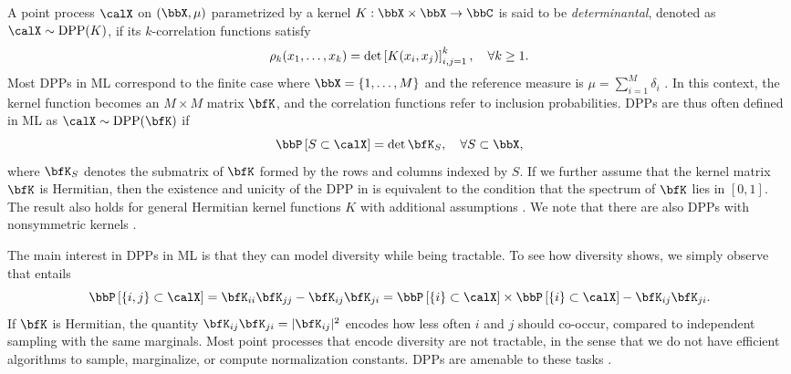 A point process $\calX$ on $(\bbX,\mu)$ parametrized by a kernel $K:\bbX\times \bbX\rightarrow \bbC$ is said to be \emph{determinantal}, denoted as $\calX\sim\DPP(K)$, if its $k$-correlation functions satisfy
  \begin{equation*}
  \label{eq:k-correlation_function_DPP}
    \rho_k(x_1,\dots,x_k)
      = \det \left[ K(x_i, x_j) \right]_{i,j=1}^k,
    \quad \forall k\geq 1.
  \end{equation*}
	Most DPPs in ML correspond to the finite case where $\bbX = \lrcb{1,\dots,M}$ and the reference measure is $\mu=\sum_{i=1}^M \delta_i$ \citep{KuTa12}.
	In this context, the kernel function becomes an $M\times M$ matrix $\bfK$, and the correlation functions refer to inclusion probabilities.
DPPs are thus often defined in ML as $\calX\sim \DPP(\bfK)$ if
  \begin{equation}
  \label{eq:inclusion_proba_finite}
    \Proba{S \subset \calX} = \det {\bfK}_S,
      \quad\forall S\subset \bbX,
  \end{equation}
where ${\bfK}_S$ denotes the submatrix of $\bfK$ formed by the rows and columns indexed by $S$.
If we further assume that the kernel matrix $\bfK$ is Hermitian, then the existence and unicity of the DPP in  is equivalent to the condition that the spectrum of $\bfK$ lies in $[0,1]$.
The result also holds for general Hermitian kernel functions $K$ with additional assumptions \cite[Theorem 3]{Sos00}.
We note that there are also DPPs with nonsymmetric kernels \citep{BoDiFu10}.

The main interest in DPPs in ML is that they can model diversity while being tractable.
To see how diversity shows, we simply observe that  entails
\begin{equation*}
\label{eq:2point_correlation_function_inclusion_proba_finite_case}
  \Proba{\{i,j\} \subset \calX} 
    = {\bfK}_{ii}{\bfK}_{jj}-{\bfK}_{ij}{\bfK}_{ji} 
    = \Proba{\{i\} \subset \calX}
      \times \Proba{\{i\} \subset \calX} 
        - {\bfK}_{ij}{\bfK}_{ji}.
\end{equation*}
If $\bfK$ is Hermitian, the quantity ${\bfK}_{ij}{\bfK}_{ji} = \vert{\bfK}_{ij}\vert^2$ encodes how less often $i$ and $j$ should co-occur, compared to independent sampling with the same marginals.
Most point processes that encode diversity are not tractable, in the sense that we do not have efficient algorithms to sample, marginalize, or compute normalization constants.
DPPs are amenable to these tasks \citep{KuTa12}.


